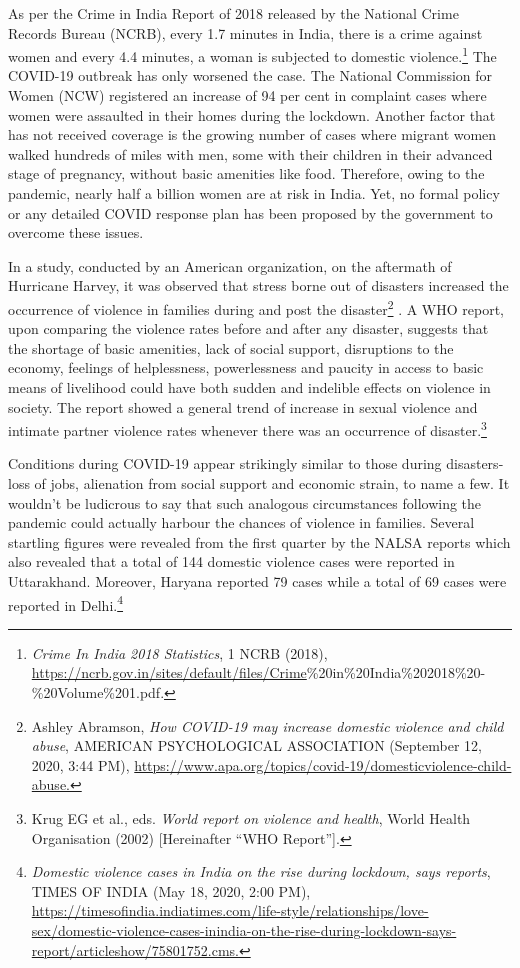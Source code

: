 \begin{multicols}{2}
\noi
As per the Crime in India Report of 2018 released by the National Crime Records Bureau
(NCRB), every 1.7 minutes in India, there is a crime against women and every 4.4 minutes, a
woman is subjected to domestic violence.\footnote{\textit{Crime In India 2018 Statistics}, 1 NCRB (2018),\\\url{https://ncrb.gov.in/sites/default/files/Crime}\%20in\%20India\%202018\%20-\%20Volume\%201.pdf.}
 The COVID-19 outbreak has only worsened the
case. The National Commission for Women (NCW) registered an increase of 94 per cent in
complaint cases where women were assaulted in their homes during the lockdown. Another
factor that has not received coverage is the growing number of cases where migrant women
walked hundreds of miles with men, some with their children in their advanced stage of
pregnancy, without basic amenities like food. Therefore, owing to the pandemic, nearly half a
billion women are at risk in India. Yet, no formal policy or any detailed COVID response
plan has been proposed by the government to overcome these issues.
 
 
 \noi
In a study, conducted by an American organization, on the aftermath of Hurricane Harvey, it
was observed that stress borne out of disasters increased the occurrence of violence in
families during and post the disaster\footnote{Ashley Abramson, \textit{How COVID-19 may increase domestic violence and child abuse}, AMERICAN
PSYCHOLOGICAL ASSOCIATION (September 12, 2020, 3:44 PM), \url{https://www.apa.org/topics/covid-19/domesticviolence-child-abuse.}}
. A WHO report, upon comparing the violence rates
before and after any disaster, suggests that the shortage of basic amenities, lack of social
support, disruptions to the economy, feelings of helplessness, powerlessness and paucity in
access to basic means of livelihood could have both sudden and indelible effects on violence
in society. The report showed a general trend of increase in sexual violence and intimate
partner violence rates whenever there was an occurrence of disaster.\footnote{Krug EG et al., eds. \textit{World report on violence and health}, World Health Organisation (2002) [Hereinafter
“WHO Report”].} 
 
 \noi
Conditions during COVID-19 appear strikingly similar to those during disasters- loss of jobs,
alienation from social support and economic strain, to name a few. It wouldn’t be ludicrous to
say that such analogous circumstances following the pandemic could actually harbour the
chances of violence in families. Several startling figures were revealed from the first quarter
by the NALSA reports which also revealed that a total of 144 domestic violence cases were reported in Uttarakhand. Moreover, Haryana reported 79 cases while a total of 69 cases were
reported in Delhi.\footnote{\textit{Domestic violence cases in India on the rise during lockdown, says reports}, TIMES OF INDIA (May 18, 2020,
2:00 PM), \url{https://timesofindia.indiatimes.com/life-style/relationships/love-sex/domestic-violence-cases-inindia-on-the-rise-during-lockdown-says-report/articleshow/75801752.cms.}}



\end{multicols}
